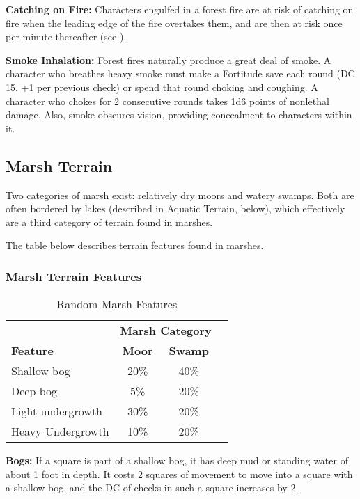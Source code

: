\textbf{Catching on Fire:} Characters engulfed in a forest fire are at risk of 
catching on fire when the leading edge of the fire overtakes them, and are then 
at risk once per minute thereafter (see ).

\textbf{Smoke Inhalation:} Forest fires naturally produce a great deal of smoke. 
A character who breathes heavy smoke must make a Fortitude save each round (DC 
15, +1 per previous check) or spend that round choking and coughing. A character 
who chokes for 2 consecutive rounds takes 1d6 points of nonlethal damage. Also, 
smoke obscures vision, providing concealment to characters within it.

\subsection{Marsh Terrain}

Two categories of marsh exist: relatively dry moors and watery swamps. Both are 
often bordered by lakes (described in Aquatic Terrain, below), which effectively 
are a third category of terrain found in marshes.

The table below describes terrain features found in marshes.

\subsubsection{Marsh Terrain Features}

\begin{table}[htb]
\caption{Random Marsh Features}
\centering
\begin{tabular}{l c c c}
 & \multicolumn{2}{c}{\textbf{Marsh Category}}\\
\textbf{Feature} & \textbf{Moor} & \textbf{Swamp}\\
Shallow bog & 20\% & 40\%\\
Deep bog & 5\% & 20\%\\
Light undergrowth & 30\% & 20\%\\
Heavy Undergrowth & 10\% & 20\%\\
\end{tabular}
\end{table}

\textbf{Bogs:} If a square is part of a shallow bog, it has deep mud or standing 
water of about 1 foot in depth. It costs 2 squares of movement to move into a square 
with a shallow bog, and the DC of  checks in such a square increases by 2. 

